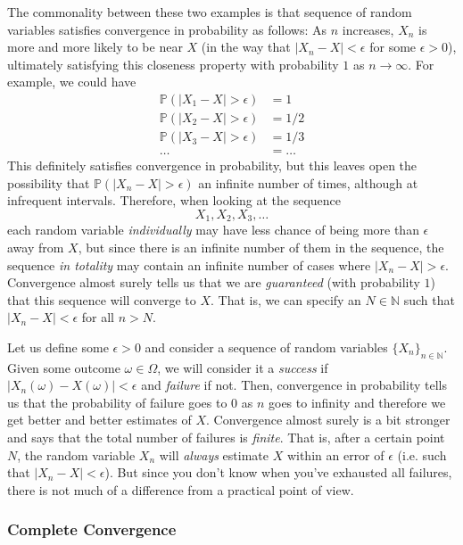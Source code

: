 \documentclass{article}
\theoremstyle{definition}
\theoremstyle{remark}
\theoremstyle{definition}
\begin{document}
The commonality between these two examples is that sequence of random variables satisfies convergence in probability as follows: As $n$ increases, $X_n$ is more and more likely to be near $X$ (in the way that $|X_n - X| < \epsilon$ for some $\epsilon > 0$), ultimately satisfying this closeness property with probability $1$ as $n \rightarrow \infty$. For example, we could have 
\begin{align*}
    \mathbb{P}(|X_1 - X| > \epsilon) & = 1 \\
    \mathbb{P}(|X_2 - X| > \epsilon) & = 1/2 \\
    \mathbb{P}(|X_3 - X| > \epsilon) & = 1/3 \\
    \ldots & = \ldots 
\end{align*}
This definitely satisfies convergence in probability, but this leaves open the possibility that $\mathbb{P}(|X_n - X| > \epsilon)$ an infinite number of times, although at infrequent intervals. Therefore, when looking at the sequence 
\[X_1, X_2, X_3, \ldots\]
each random variable \textit{individually} may have less chance of being more than $\epsilon$ away from $X$, but since there is an infinite number of them in the sequence, the sequence \textit{in totality} may contain an infinite number of cases where $|X_n - X| > \epsilon$. Convergence almost surely tells us that we are \textit{guaranteed} (with probability $1$) that this sequence will converge to $X$. That is, we can specify an $N \in \mathbb{N}$ such that $|X_n - X| < \epsilon$ for all $n > N$. 

Let us define some $\epsilon > 0$ and consider a sequence of random variables $\{X_n\}_{n \in \mathbb{N}}$. Given some outcome $\omega \in \Omega$, we will consider it a \textit{success} if $|X_n(\omega) - X(\omega)| < \epsilon$ and \textit{failure} if not. Then, convergence in probability tells us that the probability of failure goes to $0$ as $n$ goes to infinity and therefore we get better and better estimates of $X$. Convergence almost surely is a bit stronger and says that the total number of failures is \textit{finite}. That is, after a certain point $N$, the random variable $X_n$ will \textit{always} estimate $X$ within an error of $\epsilon$ (i.e. such that $|X_n - X| < \epsilon$). But since you don't know when you've exhausted all failures, there is not much of a difference from a practical point of view. 


\subsubsection{Complete Convergence}
\end{document}
